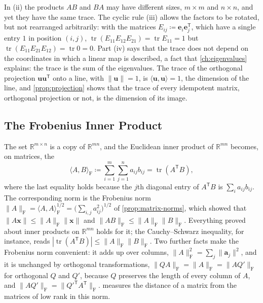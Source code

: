 In (ii) the products $AB$ and $BA$ may have different sizes, $m\times m$ and $n\times n$, and yet they have the same trace. The cyclic rule (iii) allows the factors to be rotated, but not rearranged arbitrarily: with the matrices $E_{ij}\coloneqq\mathbf e_i\mathbf e_j^{\mathsf T}$, which have a single entry $1$ in position $(i,j)$, $\operatorname{tr}(E_{11}E_{12}E_{21})=\operatorname{tr}E_{11}=1$ but $\operatorname{tr}(E_{11}E_{21}E_{12})=\operatorname{tr}0=0$. Part (iv) says that the trace does not depend on the coordinates in which a linear map is described, a fact that \cref{ch:eigenvalues} explains: the trace is the sum of the eigenvalues. The trace of the orthogonal projection $\mathbf u\mathbf u^{\mathsf T}$ onto a line, with $\|\mathbf u\|=1$, is $\langle\mathbf u,\mathbf u\rangle=1$, the dimension of the line, and \cref{prop:projection} shows that the trace of every idempotent matrix, orthogonal projection or not, is the dimension of its image.

\subsection{The Frobenius Inner Product}

The set $\mathbb R^{m\times n}$ is a copy of $\mathbb R^{mn}$, and the Euclidean inner product of $\mathbb R^{mn}$ becomes, on matrices, the 
\[
\langle A,B\rangle_{\mathrm F}\coloneqq\sum_{i=1}^m\sum_{j=1}^na_{ij}b_{ij}=\operatorname{tr}(A^{\mathsf T}B),
\]
where the last equality holds because the $j$th diagonal entry of $A^{\mathsf T}B$ is $\sum_ia_{ij}b_{ij}$. The corresponding norm is the Frobenius norm $\|A\|_{\mathrm F}=\langle A,A\rangle_{\mathrm F}^{1/2}=\bigl(\sum_{i,j}a_{ij}^2\bigr)^{1/2}$ of \cref{prop:matrix-norms}, which showed that $\|A\mathbf x\|\le\|A\|_{\mathrm F}\|\mathbf x\|$ and $\|AB\|_{\mathrm F}\le\|A\|_{\mathrm F}\|B\|_{\mathrm F}$. Everything proved about inner products on $\mathbb R^{mn}$ holds for it; the Cauchy--Schwarz inequality, for instance, reads $|\operatorname{tr}(A^{\mathsf T}B)|\le\|A\|_{\mathrm F}\|B\|_{\mathrm F}$. Two further facts make the Frobenius norm convenient: it adds up over columns, $\|A\|_{\mathrm F}^2=\sum_j\|\mathbf a_j\|^2$, and it is unchanged by orthogonal transformations, $\|QA\|_{\mathrm F}=\|A\|_{\mathrm F}=\|AQ'\|_{\mathrm F}$ for orthogonal $Q$ and $Q'$, because $Q$ preserves the length of every column of $A$, and $\|AQ'\|_{\mathrm F}=\|Q'^{\mathsf T}A^{\mathsf T}\|_{\mathrm F}$.  measures the distance of a matrix from the matrices of low rank in this norm.

